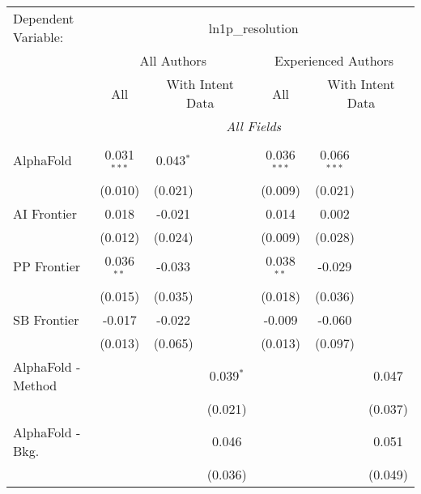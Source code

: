 \begingroup
\centering
\begin{tabular}{lcccccc}
   \tabularnewline \midrule \midrule
   Dependent Variable: & \multicolumn{6}{c}{ln1p\_resolution}\\
 & \multicolumn{3}{c}{All Authors} & \multicolumn{3}{c}{Experienced Authors} \\
\cmidrule(lr){2-4} \cmidrule(lr){5-7}
 & \multicolumn{1}{c}{All} & \multicolumn{2}{c}{With Intent Data} & \multicolumn{1}{c}{All} & \multicolumn{2}{c}{With Intent Data} \\
\cmidrule(lr){2-2} \cmidrule(lr){3-4} \cmidrule(lr){5-5} \cmidrule(lr){6-7}
 & \multicolumn{6}{c}{\textit{All Fields}} \\ \\
   AlphaFold            & 0.031$^{***}$ & 0.043$^{*}$ &                & 0.036$^{***}$ & 0.066$^{***}$ &   \\   
                        & (0.010)       & (0.021)     &                & (0.009)       & (0.021)       &   \\   
   AI Frontier          & 0.018         & -0.021      &                & 0.014         & 0.002         &   \\   
                        & (0.012)       & (0.024)     &                & (0.009)       & (0.028)       &   \\   
   PP Frontier          & 0.036$^{**}$  & -0.033      &                & 0.038$^{**}$  & -0.029        &   \\   
                        & (0.015)       & (0.035)     &                & (0.018)       & (0.036)       &   \\   
   SB Frontier          & -0.017        & -0.022      &                & -0.009        & -0.060        &   \\   
                        & (0.013)       & (0.065)     &                & (0.013)       & (0.097)       &   \\   
   AlphaFold - Method   &               &             & 0.039$^{*}$    &               &               & 0.047\\   
                        &               &             & (0.021)        &               &               & (0.037)\\   
   AlphaFold - Bkg.     &               &             & 0.046          &               &               & 0.051\\   
                        &               &             & (0.036)        &               &               & (0.049)\\   

\end{tabular}
